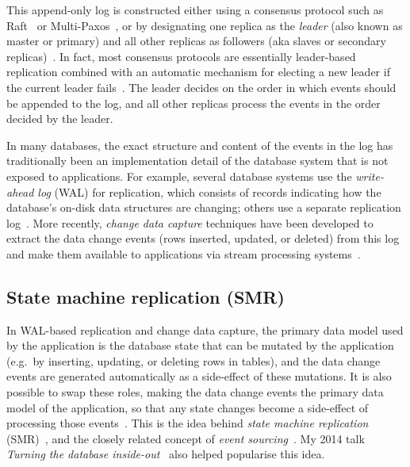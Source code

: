 \documentclass[sigconf]{acmart}
\begin{document}
This append-only log is constructed either using a consensus protocol such as Raft~\cite{Ongaro:2014} or Multi-Paxos~\cite{Lamport:2001}, or by designating one replica as the \emph{leader} (also known as master or primary) and all other replicas as followers (aka slaves or secondary replicas)~\cite{Gray:1996}.
In fact, most consensus protocols are essentially leader-based replication combined with an automatic mechanism for electing a new leader if the current leader fails~\cite{Howard:2020}.
The leader decides on the order in which events should be appended to the log, and all other replicas process the events in the order decided by the leader.

In many databases, the exact structure and content of the events in the log has traditionally been an implementation detail of the database system that is not exposed to applications.
For example, several database systems use the \emph{write-ahead log} (WAL) for replication, which consists of records indicating how the database's on-disk data structures are changing; others use a separate replication log~\cite{Hellerstein:2007}.
More recently, \emph{change data capture} techniques have been developed to extract the data change events (rows inserted, updated, or deleted) from this log and make them available to applications via stream processing systems~\cite{Das:2012,Debezium}.

\subsection{State machine replication (SMR)}\label{sec:smr}

In WAL-based replication and change data capture, the primary data model used by the application is the database state that can be mutated by the application (e.g.\ by inserting, updating, or deleting rows in tables), and the data change events are generated automatically as a side-effect of these mutations.
It is also possible to swap these roles, making the data change events the primary data model of the application, so that any state changes become a side-effect of processing those events~\cite{Kreps:2011}.
This is the idea behind \emph{state machine replication} (SMR)~\cite{Schneider:1990}, and the closely related concept of \emph{event sourcing}~\cite{Fowler:2005,Zimarev:2020}.
My 2014 talk \emph{Turning the database inside-out}~\cite{InsideOut} also helped popularise this idea.
\end{document}
